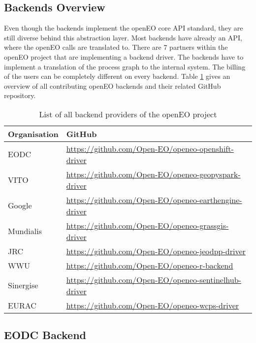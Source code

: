 \documentclass[draft,final]{vutinfth} %
\begin{document}
\subsection{Backends Overview}\label{Backend Overview}
Even though the backends implement the openEO core API standard, they are still diverse behind this abstraction layer. Most backends have already an API, where the openEO calls are translated to. There are 7 partners within the openEO project that are implementing a backend driver. The backends have to implement a translation of the process graph to the internal system. The billing of the users can be completely different on every backend. Table \ref{Tab:backends} gives an overview of all contributing openEO backends and their related GitHub repository.
\begin{table}[]
	\caption{List of all backend providers of the openEO project}
	\begin{tabular}{l|l}
		\textbf{Organisation} & \textbf{GitHub}  \\ \hline
		EODC & \url{https://github.com/Open-EO/openeo-openshift-driver} \\ \hline 
		VITO & \url{https://github.com/Open-EO/openeo-geopyspark-driver} \\ \hline  
		Google  & \url{https://github.com/Open-EO/openeo-earthengine-driver} \\ \hline  
		Mundialis & \url{https://github.com/Open-EO/openeo-grassgis-driver} \\ \hline 
		JRC & \url{https://github.com/Open-EO/openeo-jeodpp-driver} \\ \hline
		WWU & \url{https://github.com/Open-EO/openeo-r-backend} \\ \hline
		Sinergise & \url{https://github.com/Open-EO/openeo-sentinelhub-driver} \\ \hline
		EURAC & \url{https://github.com/Open-EO/openeo-wcps-driver} \\ 
	\end{tabular}
	\label{Tab:backends}
\end{table}

\subsection{EODC Backend}\label{EODC Back End}
\end{document}
